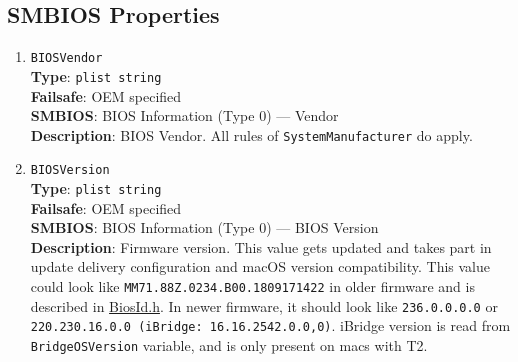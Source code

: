 \documentclass[]{article}
\begin{document}
\subsection{SMBIOS Properties}\label{platforminfosmbios}

\begin{enumerate}
\item
  \texttt{BIOSVendor}\\
  \textbf{Type}: \texttt{plist\ string}\\
  \textbf{Failsafe}: OEM specified\\
  \textbf{SMBIOS}: BIOS Information (Type 0) --- Vendor\\
  \textbf{Description}: BIOS Vendor. All rules of
  \texttt{SystemManufacturer} do apply.
\item
  \texttt{BIOSVersion}\\
  \textbf{Type}: \texttt{plist\ string}\\
  \textbf{Failsafe}: OEM specified\\
  \textbf{SMBIOS}: BIOS Information (Type 0) --- BIOS Version\\
  \textbf{Description}: Firmware version. This value gets updated and
  takes part in update delivery configuration and macOS version
  compatibility. This value could look like
  \texttt{MM71.88Z.0234.B00.1809171422} in older firmware and is
  described in
  \href{https://github.com/acidanthera/OpenCorePkg/blob/master/Include/Apple/Guid/BiosId.h}{BiosId.h}.
  In newer firmware, it should look like \texttt{236.0.0.0.0} or
  \texttt{220.230.16.0.0\ (iBridge:\ 16.16.2542.0.0,0)}. iBridge version
  is read from \texttt{BridgeOSVersion} variable, and is only present on
  macs with T2.


\end{enumerate}
\end{document}
